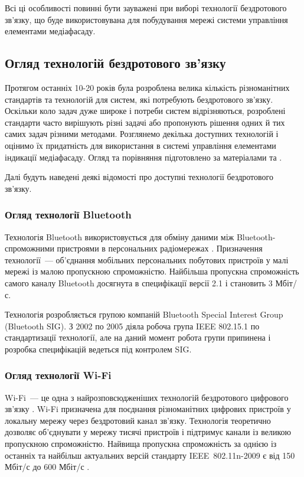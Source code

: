 \documentclass[a4paper,ukrainian,utf8,nocolumnsxix,nocolumnxxxii,nocolumnxxxi,floatsection,equationsection]{eskdtext}
\renewcommand\paragraph{\subsubsection}
\begin{document}
Всі ці особливості повинні бути зауважені при виборі технології бездротового зв'язку, що буде використовувана для побудування мережі системи управління елементами медіафасаду.


\subsection{Огляд технологій бездротового зв'язку}

Протягом останніх 10-20 років була розроблена велика кількість різноманітних стандартів та технологій для систем, які потребують бездротового зв'язку. Оскільки коло задач дуже широке і потреби систем відрізняються, розроблені стандарти часто вирішують різні задачі або пропонують рішення одних й тих самих задач різними методами. Розглянемо декілька доступних технологій і оцінимо їх придатність для використання в системі управління елементами індикації медіафасаду. Огляд та порівняння підготовлено за матеріалами \cite{comparative:wireless:protocols} та \cite{garcia2008:problem:solving}.

Далі будуть наведені деякі відомості про доступні технології бездротового зв'язку.

\paragraph{Огляд технології Bluetooth} %
\label{par:bluetooth_bluetooth_low_energy}

Технологія Bluetooth використовується для обміну даними між Bluetooth-спроможними пристроями в персональних радіомережах \cite{garcia2008:problem:solving}. Призначення технології~--- об'єднання мобільних персональних побутових пристроїв у малі мережі із малою пропускною спроможністю. Найбільша пропускна спроможність самого каналу Bluetooth досягнута в специфікації версії 2.1 \cite{bluetooth:core:spec:2_1} і становить 3 Мбіт/с.

Технологія розробляється групою компаній Bluetooth Special Interest Group (Bluetooth SIG). З 2002 по 2005 діяла робоча група IEEE 802.15.1 по стандартизації технології, але на даний момент робота групи припинена і розробка специфікацій ведеться під контролем SIG.


\paragraph{Огляд технології Wi-Fi} %
\label{par:wi_fi}

Wi-Fi~--- це одна з найрозповсюдженіших технологій бездротового цифрового зв'язку \cite{garcia2008:problem:solving}. Wi-Fi призначена для поєднання різноманітних цифрових пристроїв у локальну мережу через бездротовий канал зв'язку. Технологія теоретично дозволяє об'єднувати у мережу тисячі пристроїв і підтримує канали із великою пропускною спроможністю. Найвища пропускна спроможність за однією із останніх та найбільш актуальних версій стандарту IEEE~802.11n-2009 є від 150 Мбіт/с до 600 Мбіт/с \cite{comparative:wireless:protocols}.
\end{document}
